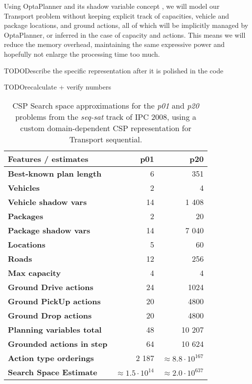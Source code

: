 {Using OptaPlanner and its shadow variable concept \citep[Section~4.3.6]{DeSmet2017}, we will model our Transport problem without keeping explicit track of capacities,
vehicle and package locations, and ground actions, all of which will be implicitly managed by OptaPlanner, or inferred in the case of capacity and actions.
This means we will reduce the memory overhead, maintaining the same expressive power
and hopefully not enlarge the processing time too much.

TODO{Describe the specific representation after it is polished in the code}

TODO{recalculate + verify numbers}

\begin{table}[tb]
\begin{center}
\begin{tabular}{l||rr}
\textbf{Features / estimates} & \textbf{p01} & \textbf{p20} \\
\midrule
\midrule
\textbf{Best-known plan length} & 6 & 351 \\
\textbf{Vehicles} & 2 & 4 \\
\textbf{Vehicle shadow vars} & 14 & 1 408 \\
\textbf{Packages} & 2 & 20 \\
\textbf{Package shadow vars} & 14 & 7 040 \\
\textbf{Locations} & 5 & 60 \\
\textbf{Roads} & 12 & 256 \\
\textbf{Max capacity} & 4 & 4 \\
\midrule
\textbf{Ground Drive actions} & 24 & 1024 \\
\textbf{Ground PickUp actions} & 20 & 4800 \\
\textbf{Ground Drop actions} & 20 & 4800 \\
\midrule
\textbf{Planning variables total} & 48 & 10 207 \\
\textbf{Grounded actions in step} & 64 & 10 624 \\
\textbf{Action type orderings} & 2 187 & $\approx 8.8 \cdot 10^{167}$ \\
\textbf{Search Space Estimate} & $\approx 1.5 \cdot 10^{14}$ & $\approx 2.0 \cdot 10^{637}$ \\
\end{tabular}
\end{center}
\caption[Search space approximations for a domain-dependent CSP representation.]{CSP Search space approximations for the \textit{p01} and \textit{p20} problems from the \textit{seq-sat} track of IPC 2008, using a custom domain-dependent CSP representation for Transport sequential.}
\label{tab:csp-custom}
\end{table}

}
